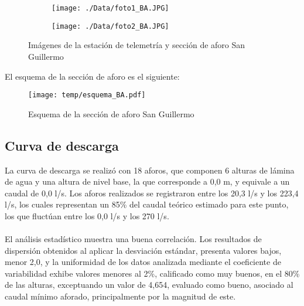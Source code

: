 \documentclass[]{article}
\begin{document}
\begin{figure}[H]
  \centering
\begin{subfigure}{.49\textwidth}
  \texttt{[image: ./Data/foto1\_BA.JPG]}
\end{subfigure}
\hfill
\begin{subfigure}{.49\textwidth}
  \texttt{[image: ./Data/foto2\_BA.JPG]}
\end{subfigure}
\caption{Imágenes de la estación de telemetría y sección de aforo San Guillermo}
\label{fig:fotos_27}
\end{figure}

El esquema de la sección de aforo es el siguiente:

\begin{figure}[H]
  \centering
  \texttt{[image: temp/esquema\_BA.pdf]}
\caption{Esquema de la sección de aforo San Guillermo}
\label{fig:Esquema_BA}
\end{figure}

\subsection{Curva de descarga}\label{curva-de-descarga-26}

La curva de descarga se realizó con 18 aforos, que componen 6 alturas de lámina de agua y una altura de nivel base, la que corresponde a 0,0 m, y equivale a un caudal de 0,0 l/s. Los aforos realizados se registraron entre los 20,3 l/s y los 223,4 l/s, los cuales representan un 85\% del caudal teórico estimado para este punto, los que fluctúan entre los 0,0 l/s y los 270 l/s. \\
\\
El análisis estadístico muestra una buena correlación. Los resultados de dispersión obtenidos al aplicar la desviación estándar, presenta valores bajos, menor 2,0, y la uniformidad de los datos analizada mediante el coeficiente de variabilidad exhibe  valores menores al 2\%, calificado como muy buenos, en el 80\% de las alturas, exceptuando un valor de 4,654, evaluado como bueno, asociado al caudal mínimo aforado, principalmente por la magnitud de este.
\end{document}
